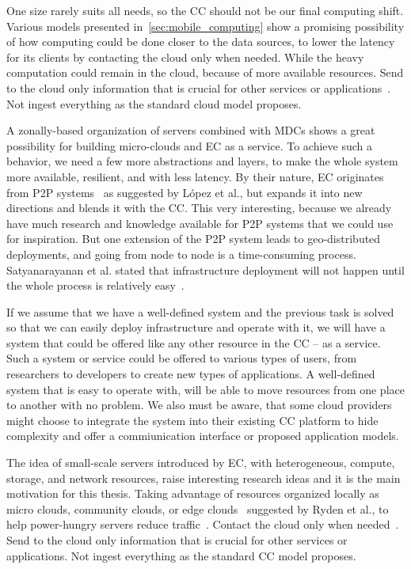 One size rarely suits all needs, so the CC should not be our final computing shift. Various models presented in~\ref{sec:mobile_computing} show a promising possibility of how computing could be done closer to the data sources, to lower the latency for its clients by contacting the cloud only when needed. While the heavy computation could remain in the cloud, because of more available resources. Send to the cloud only information that is crucial for other services or applications~\cite{inproceedingsSimic1}. Not ingest everything as the standard cloud model proposes.

A zonally-based organization of servers combined with MDCs shows a great possibility for building micro-clouds and EC as a service. To achieve such a behavior, we need a few more abstractions and layers, to make the whole system more available, resilient, and with less latency. By their nature, EC originates from P2P systems~\cite{LopezMEDHIBFR15} as suggested by L{\'{o}}pez et al., but expands it into new directions and blends it with the CC. This very interesting, because we already have much research and knowledge available for P2P systems that we could use for inspiration. But one extension of the P2P system leads to geo-distributed deployments, and going from node to node is a time-consuming process. Satyanarayanan et al. stated that infrastructure deployment will not happen until the whole process is relatively easy~\cite{SatyanarayananBCD09}. 

If we assume that we have a well-defined system and the previous task is solved so that we can easily deploy infrastructure and operate with it, we will have a system that could be offered like any other resource in the CC -- as a service. Such a system or service could be offered to various types of users, from researchers to developers to create new types of applications. A well-defined system that is easy to operate with, will be able to move resources from one place to another with no problem. We also must be aware, that some cloud providers might choose to integrate the system into their existing CC platform to hide complexity and offer a commiunication interface or proposed application models.

The idea of small-scale servers introduced by EC, with heterogeneous, compute, storage, and network resources, raise interesting research ideas and it is the main motivation for this thesis. Taking advantage of resources organized locally as micro clouds, community clouds, or edge clouds~\cite{RydenOCW14} suggested by Ryden et al., to help power-hungry servers reduce traffic~\cite{HirschMZ18}. Contact the cloud only when needed~\cite{inproceedingsSimic1}. Send to the cloud only information that is crucial for other services or applications. Not ingest everything as the standard CC model proposes.

